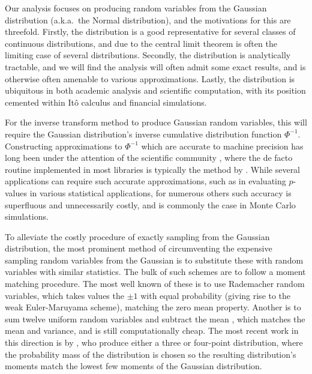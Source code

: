 \documentclass[manuscript]{acmart}
\begin{document}
Our analysis focuses on producing random variables from the Gaussian distribution (a.k.a.\ the Normal distribution), and the motivations for this are threefold. Firstly, the distribution is a good representative for several classes of continuous distributions, and due to the central limit theorem is often the limiting case of several distributions. Secondly, the distribution is analytically tractable, and we will find the analysis will often admit some exact results, and is otherwise often amenable to various approximations. Lastly, the distribution is ubiquitous in both academic analysis and scientific computation, with its position cemented within It\^{o} calculus and financial simulations. 

For the inverse transform method to produce Gaussian random variables, this will require the Gaussian distribution's inverse cumulative distribution function $ \Phi^{-1} $. Constructing approximations to $ \Phi^{-1} $ which are accurate to machine precision has long been under the attention of the scientific community \citep{hastings1955approximations,evans1974algorithm70,beasley1985percentage,wichura1988algorithm,marsaglia1994rapid,giles2011approximating}, where the de facto routine implemented in most libraries is typically the method by \citet{wichura1988algorithm}. While several applications can require such accurate approximations, such as in evaluating $ p $-values in various statistical applications, for numerous others such accuracy is superfluous and unnecessarily costly, and is commonly the case in Monte Carlo simulations. 

To alleviate the costly procedure of exactly sampling from the Gaussian distribution, the most prominent method of circumventing the expensive sampling random variables from the Gaussian is to substitute these with random variables with similar statistics. The bulk of such schemes are to follow a moment matching procedure. The most well known of these is to use Rademacher random variables, which takes values the $ \pm 1 $ with equal probability \citep[page~XXXII]{kloeden1999numerical} (giving rise to the weak Euler-Maruyama scheme), matching the zero mean property. Another is to sum twelve uniform random variables and subtract the mean \citep[page~500]{munk2011fixed}, which matches the mean and variance, and is still computationally cheap. The most recent work in this direction is by \citet{muller2015improving}, who produce either a three or four-point distribution, where the probability mass of the distribution is chosen so the resulting distribution's moments match the lowest few moments of the Gaussian distribution. 
\end{document}
